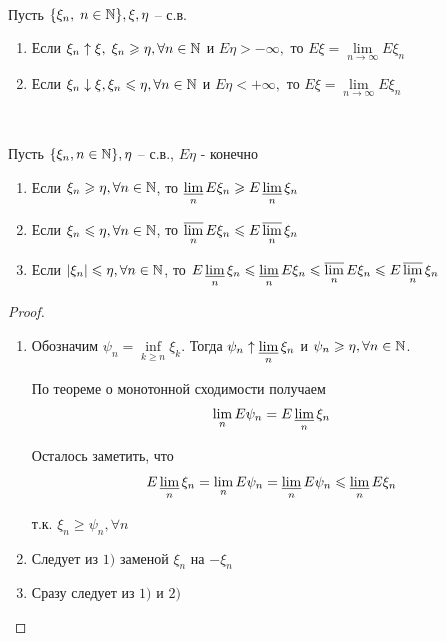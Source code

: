 \begin{theorem}~

  Пусть $\{\xi_n,\; n \in \mathbb{N}\}, \xi, \eta$ -- с.в.

  \begin{enumerate}
    \item 
      Если $\xi_n \uparrow \xi,\; \xi_n \geqslant \eta, \forall n \in \mathbb{N}$ и
      $E \eta > -\infty,$ то $E\xi = \lim\limits_{n \to \infty} E \xi_n$
      
    \item 
      Если $\xi_n \downarrow \xi, \xi_n \leqslant \eta, \forall n \in \mathbb{N}$ и $E \eta < +\infty,$
      то $E\xi = \lim\limits_{n \to \infty} E \xi_n$
  \end{enumerate}

\end{theorem}

\begin{theorem}~

  Пусть $\{\xi_n, n \in \mathbb{N}\}, \eta$ -- с.в.,\; $E\eta $ - конечно

  \begin{enumerate}
    \item
      Если $\xi_n \geqslant \eta, \forall n \in \mathbb{N}$, то \quad
      $\varliminf\limits_n E \xi_n \geqslant E \varliminf\limits_n \xi_n$ 

    \item
      Если $\xi_n \leqslant \eta, \forall n \in \mathbb{N}$, то \quad
      $\varlimsup\limits_n E \xi_n \leqslant E \varlimsup\limits_n \xi_n$ 

    \item
      Если $|\xi_n| \leqslant \eta, \forall n \in \mathbb{N}$, то \quad
      $E \varliminf\limits_n \xi_n \leqslant \varliminf\limits_n E \xi_n \leqslant \varlimsup\limits_n E\xi_n \leqslant E \varlimsup\limits_n \xi_n$ 
  \end{enumerate}

  \begin{proof}~

    \begin{enumerate}
      \item
        Обозначим $\psi_n = \inf\limits_{k \geq n} \xi_k$. Тогда
        $\psi_n \uparrow \varliminf\limits_n \xi_n$ и $\psi_n \geqslant \eta, \forall n \in \mathbb{N}$.

        По теореме о монотонной  сходимости получаем
        \begin{align*}
          \lim_n E \psi_n = E  \varliminf\limits_n \xi_n
        \end{align*}

        Осталось заметить, что 
        \begin{align*}
          E \varliminf\limits_n \xi_n = \lim_n E \psi_n = \varliminf\limits_n E \psi_n \leqslant \varliminf\limits_n E \xi_n
        \end{align*}

        т.к. $\xi_n \geq \psi_n, \forall n$

      \item
        Следует из $1)$ заменой $\xi_n$ на $- \xi_n$

      \item
        Сразу следует из $1)$ и $2)$
    \end{enumerate}
  \end{proof}
\end{theorem}

